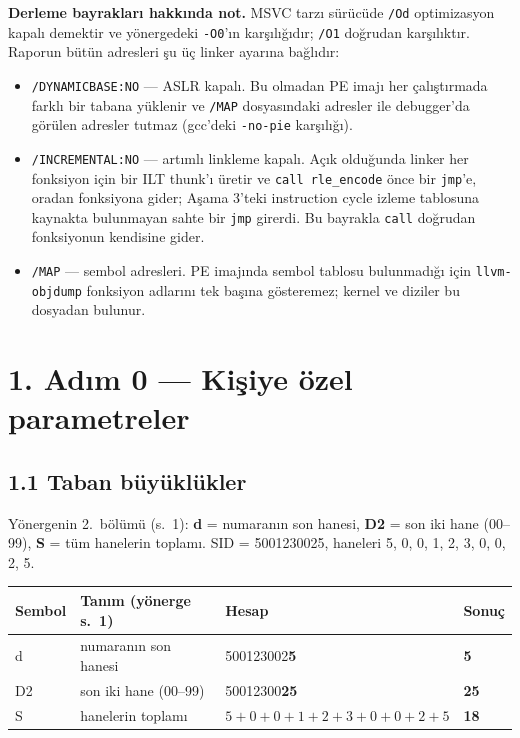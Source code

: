 \documentclass[11pt,a4paper]{article}
\newcommand{\tl}{\texttt}
\begin{document}
\textbf{Derleme bayrakları hakkında not.} MSVC tarzı sürücüde \tl{/Od} optimizasyon kapalı demektir
ve yönergedeki \tl{-O0}'ın karşılığıdır; \tl{/O1} doğrudan karşılıktır. Raporun bütün adresleri
şu üç linker ayarına bağlıdır:

\begin{itemize}
\item \tl{/DYNAMICBASE:NO} --- ASLR kapalı. Bu olmadan PE imajı her çalıştırmada farklı bir tabana
yüklenir ve \tl{/MAP} dosyasındaki adresler ile debugger'da görülen adresler tutmaz
(gcc'deki \tl{-no-pie} karşılığı).
\item \tl{/INCREMENTAL:NO} --- artımlı linkleme kapalı. Açık olduğunda linker her fonksiyon için bir
ILT thunk'ı üretir ve \tl{call rle\_encode} önce bir \tl{jmp}'e, oradan fonksiyona gider; Aşama 3'teki
instruction cycle izleme tablosuna kaynakta bulunmayan sahte bir \tl{jmp} girerdi. Bu bayrakla
\tl{call} doğrudan fonksiyonun kendisine gider.
\item \tl{/MAP} --- sembol adresleri. PE imajında sembol tablosu bulunmadığı için \tl{llvm-objdump}
fonksiyon adlarını tek başına gösteremez; kernel ve diziler bu dosyadan bulunur.
\end{itemize}

\section*{1. Adım 0 --- Kişiye özel parametreler}

\subsection*{1.1 Taban büyüklükler}

Yönergenin 2.~bölümü (s.~1): \textbf{d} = numaranın son hanesi, \textbf{D2} = son iki hane (00--99),
\textbf{S} = tüm hanelerin toplamı. SID = 5001230025, haneleri 5, 0, 0, 1, 2, 3, 0, 0, 2, 5.

\begin{longtable}{p{1.3cm}p{4.2cm}p{6.5cm}p{2.2cm}}
\toprule
\textbf{Sembol} & \textbf{Tanım (yönerge s.~1)} & \textbf{Hesap} & \textbf{Sonuç}\\
\midrule
d  & numaranın son hanesi  & 500123002\textbf{5}                      & \textbf{5}\\
D2 & son iki hane (00--99) & 50012300\textbf{25}                      & \textbf{25}\\
S  & hanelerin toplamı     & $5{+}0{+}0{+}1{+}2{+}3{+}0{+}0{+}2{+}5$  & \textbf{18}\\
\bottomrule
\end{longtable}
\end{document}
